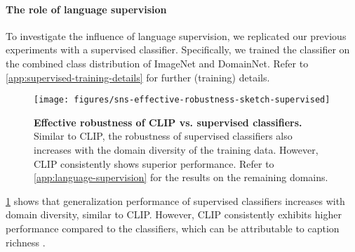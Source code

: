 \paragraph{The role of language supervision}
To investigate the influence of language supervision, we replicated our previous experiments with a supervised classifier. Specifically, we trained the classifier on the combined class distribution of ImageNet and DomainNet. Refer to \cref{app:supervised-training-details} for further (training) details.

\begin{figure}[t]
    \centering
    \texttt{[image: figures/sns-effective-robustness-sketch-supervised]}
    \caption{\textbf{Effective robustness of CLIP vs. supervised classifiers.} Similar to CLIP, the robustness of supervised classifiers also increases with the domain diversity of the training data. However, CLIP consistently shows superior performance. Refer to \cref{app:language-supervision} for the results on the remaining domains.}
    \label{fig:effective-robustness-supervised}
\end{figure}
\cref{fig:effective-robustness-supervised} shows that generalization performance of supervised classifiers increases with domain diversity, similar to CLIP. However, CLIP consistently exhibits higher performance compared to the classifiers, which can be attributable to caption richness \citep{xue2024understanding,wen2024makes}.